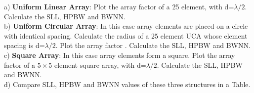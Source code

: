 \documentclass[paper=a4, fontsize=11pt]{scrartcl} %
\numberwithin{equation}{section} %
\numberwithin{figure}{section} %
\numberwithin{table}{section} %
\begin{document}
a) \textbf{Uniform Linear Array}: Plot the array factor of a 25 element, with d=$\lambda/2$. Calculate the SLL, HPBW and BWNN. \\

b) \textbf{Uniform Circular Array}: In this case array elements are placed on a circle with identical spacing. Calculate the radius of a 25 element UCA whose element spacing is d=$\lambda/2$.
Plot the array factor . Calculate the SLL, HPBW and BWNN.\\

c) \textbf{Square Array}: In this case array elements form a square. Plot the array factor of a $5\times 5$ element square array, with d=$\lambda/2$. Calculate the SLL, HPBW and BWNN.\\

d) Compare  SLL, HPBW and BWNN values of these three structures in a Table.


\end{document}
